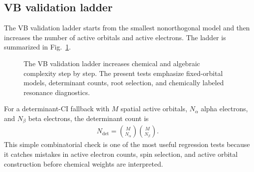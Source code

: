 \documentclass[11pt]{article}
\begin{document}
\subsection{VB validation ladder}

The VB validation ladder starts from the smallest nonorthogonal model and then increases the number of active orbitals and active electrons.  The ladder is summarized in Fig.~\ref{fig:vb-validation-ladder}.

\begin{figure}[htbp]
\centering
{}
\caption{The VB validation ladder increases chemical and algebraic complexity step by step.  The present tests emphasize fixed-orbital models, determinant counts, root selection, and chemically labeled resonance diagnostics.}
\label{fig:vb-validation-ladder}
\end{figure}

For a determinant-CI fallback with $M$ spatial active orbitals, $N_{\alpha}$ alpha electrons, and $N_{\beta}$ beta electrons, the determinant count is
\begin{equation}
\begin{aligned}
	N_{\mathrm{det}}
	= \binom{M}{N_{\alpha}}\binom{M}{N_{\beta}}.
\end{aligned}
\end{equation}
This simple combinatorial check is one of the most useful regression tests because it catches mistakes in active electron counts, spin selection, and active orbital construction before chemical weights are interpreted.
\end{document}
